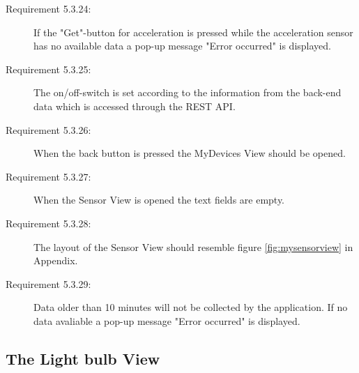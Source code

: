 \documentclass[a4paper]{article}
\begin{document}
\begin{description}
\item[Requirement 5.3.24:] If the "Get"-button for acceleration is pressed while the acceleration sensor has no available data a pop-up message "Error occurred" is displayed.

\item[Requirement 5.3.25:] The on/off-switch is set according to the information from the back-end data which is accessed through the REST API.

\item[Requirement 5.3.26:] When the back button is pressed the MyDevices View should be opened.

\item[Requirement 5.3.27:] When the Sensor View is opened the text fields are empty.

\item[Requirement 5.3.28:] The layout of the Sensor View should resemble figure \ref{fig:mysensorview} in Appendix.

\item[Requirement 5.3.29:] Data older than 10 minutes will not be collected by the application. If no data avaliable a pop-up message "Error occurred" is displayed.

\end{description}


\subsection{The Light bulb View}
\end{document}
